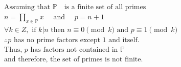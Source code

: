 $$
\begin{aligned}
&\text{Assuming that $\mathbb{P}$ }\text{ is a finite set of all primes} \\
&n = \prod_{x \in \mathbb{P}}^{} x \quad \text{ and } \quad p = n+1 \\
&\forall k \in Z, \text{ if } k | n \text{ then } n \equiv 0 \pmod{k} \text{ and } p \equiv 1 \pmod{k} \\
&\therefore p \text{ has no prime factors except 1 and itself.} \\
&\text{Thus, } p \text{ has factors not contained in } \mathbb{P} \\
&\text{and therefore, the set of primes is not finite.}
\end{aligned}
$$
